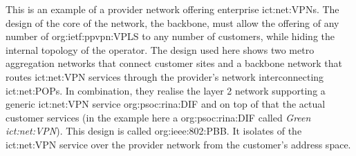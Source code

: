 This is an example of a provider network offering enterprise \acp{ict:net:VPN}.
The design of the core of the network, the backbone, must allow the offering of any number of \ac{org:ietf:ppvpn:VPLS} to any number of customers, while hiding the internal topology of the operator.
The design used here shows two metro aggregation networks that connect customer sites and a backbone network that routes \ac{ict:net:VPN} services through the provider's network interconnecting \acp{ict:net:POP}.
In combination, they realise the layer 2 network supporting a generic \ac{ict:net:VPN} service \ac{org:psoc:rina:DIF} and on top of that the actual customer services (in the example here a \ac{org:psoc:rina:DIF} called \textit{Green \acs{ict:net:VPN}}).
This design is called \ac{org:ieee:802:PBB}.
It isolates of the \ac{ict:net:VPN} service over the provider network from the customer's address space.
